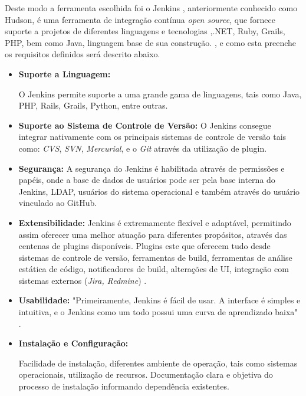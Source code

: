 Deste modo a ferramenta escolhida foi o Jenkins , anteriormente conhecido como Hudson, é uma ferramenta de integração contínua \textit{open source}, que fornece suporte a projetos de diferentes linguagens e tecnologias ,.NET, Ruby, Grails, PHP, bem como Java, linguagem base de sua construção. \cite{smart2011}, e como esta preenche os requisitos definidos será descrito abaixo.

\begin{itemize}
\item {\textbf{Suporte a Linguagem:}}

O Jenkins permite suporte a uma grande gama de linguagens, tais como Java, PHP, Rails, Grails, Python, entre outras.

\item {\textbf{Suporte ao Sistema de Controle de Versão:}}
O Jenkins consegue integrar nativamente com os principais sistemas de controle de versão tais como: \textit{CVS}, \textit{SVN},  \textit{Mercurial}, e o \textit{Git} através da utilização de plugin.


\item {\textbf{Segurança:}}
A segurança do Jenkins é habilitada através de permissões e papéis, onde a base de dados de usuários pode ser pela base interna do Jenkins, LDAP, usuários do sistema operacional e também através do usuário vinculado ao GitHub.

\item {\textbf{Extensibilidade:}}
Jenkins é extremamente flexível e adaptável, permitindo assim oferecer uma melhor atuação para diferentes propósitos, através das centenas de plugins disponíveis. Plugins este que oferecem tudo desde sistemas de controle de versão, ferramentas de build, ferramentas de análise estática de código, notificadores de build, alterações de UI, integração com sistemas externos (\textit{Jira, Redmine}) \cite{smart2011}.


\item {\textbf{Usabilidade:}}
"Primeiramente, Jenkins é fácil de usar. A interface é simples e intuitiva, e o Jenkins como um todo possui uma curva de aprendizado baixa" .

\item {\textbf{Instalação e Configuração:}}

Facilidade de instalação, diferentes ambiente de operação, tais como sistemas operacionais, utilização de recursos. Documentação clara e objetiva do processo de instalação informando dependência existentes.

\end{itemize}

